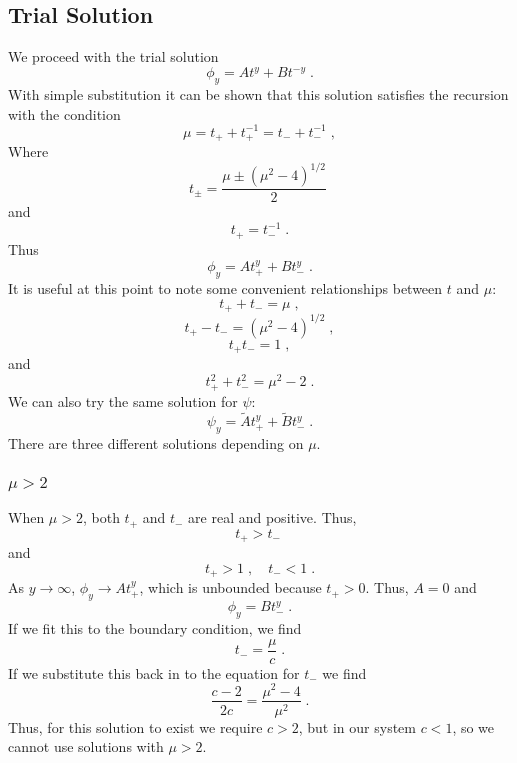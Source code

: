 \documentclass[a4paper,10pt]{article}
\begin{document}
\subsection{Trial Solution}
We proceed with the trial solution
\begin{equation}
  \phi_y = At^y + Bt^{-y} \;.
\end{equation}
With simple substitution it can be shown that this solution satisfies the recursion with the condition
\begin{equation}
  \mu = t_+ + t_+^{-1} = t_- + t_-^{-1} \;,
\end{equation}
Where
\begin{equation}
  t_\pm = \frac{\mu \pm (\mu^2-4)^{1/2}}{2} \;
\end{equation}
and
\begin{equation}
  t_+ = t_-^{-1} \;.
\end{equation}
Thus
\begin{equation}
  \phi_y = At_+^y + Bt_-^y \;.
\end{equation}
It is useful at this point to note some convenient relationships between $t$ and $\mu$:
\begin{equation}
  t_+ + t_- = \mu \;,
\end{equation}
\begin{equation}
  t_+ - t_- = (\mu^2 -4)^{1/2} \;,
\end{equation}
\begin{equation}
  t_+t_- = 1 \;,
\end{equation}
and
\begin{equation}
  t_+^2 + t_-^2 = \mu^2 - 2 \;.
\end{equation}
We can also try the same solution for $\psi$:
\begin{equation}
  \psi_y = \tilde{A}t_+^y + \tilde{B}t_-^y \;.
\end{equation}
There are three different solutions depending on $\mu$. 

\subsubsection{$\mu > 2$}

When $\mu > 2$, both $t_+$ and $t_-$ are real and positive. Thus,
\begin{equation}
  t_+ > t_- \;
\end{equation}
and
\begin{equation}
  t_+ > 1 \;, \quad t_- < 1 \;.
\end{equation}
As $y\to \infty$, $\phi_y \to At_+^y$, which is unbounded because $t_+>0$. Thus, $A=0$ and
\begin{equation}
  \phi_y = Bt_-^y \;.
\end{equation}
If we fit this to the boundary condition, we find
\begin{equation}
  t_- = \frac{\mu}{c} \;.
\end{equation}
If we substitute this back in to the equation for $t_-$ we find
\begin{equation}
  \frac{c-2}{2c} = \frac{\mu^2-4}{\mu^2} \;.
\end{equation}
Thus, for this solution to exist we require $c > 2$, but in our system $c < 1$, so we cannot use solutions with $\mu > 2$.
\end{document}
